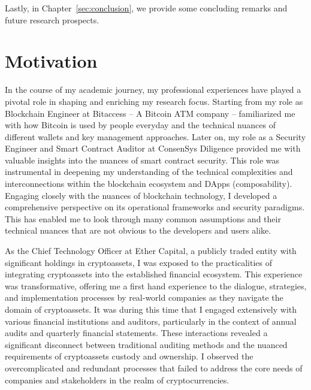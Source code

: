 Lastly, in Chapter~\ref{sec:conclusion}, we provide some concluding remarks and future research prospects.


\section{Motivation} \label{sec:intro:motivation}
In the course of my academic journey, my professional experiences have played a pivotal role in shaping and enriching my research focus. Starting from my role as Blockchain Engineer at Bitaccess -- A Bitcoin ATM company -- familiarized me with how Bitcoin is used by people everyday and the technical nuances of different wallets and key management approaches. Later on, my role as a Security Engineer and Smart Contract Auditor at ConsenSys Diligence provided me with valuable insights into the nuances of smart contract security. This role was instrumental in deepening my understanding of the technical complexities and interconnections within the blockchain ecosystem and DApps (composability). Engaging closely with the nuances of blockchain technology, I developed a comprehensive perspective on its operational frameworks and security paradigms. This has enabled me to look through many common assumptions and their technical nuances that are not obvious to the developers and users alike.

As the Chief Technology Officer at Ether Capital, a publicly traded entity with significant holdings in cryptoassets, I was exposed to the practicalities of integrating cryptoassets into the established financial ecosystem. This experience was transformative, offering me a first hand experience to the dialogue, strategies, and implementation processes by real-world companies as they navigate the domain of cryptoassets. It was during this time that I engaged extensively with various financial institutions and auditors, particularly in the context of annual audits and quarterly financial statements. These interactions revealed a significant disconnect between traditional auditing methods and the nuanced requirements of cryptoassets custody and ownership. I observed the overcomplicated and redundant processes that failed to address the core needs of companies and stakeholders in the realm of cryptocurrencies.

